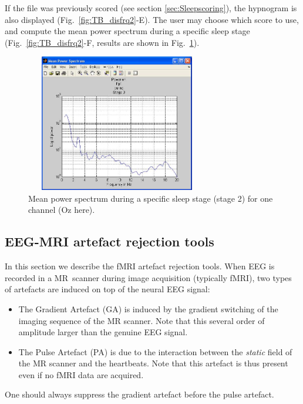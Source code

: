 \documentclass[a4paper,titlepage]{article}
\newcommand{\bi}{\begin{itemize}}
\newcommand{\ei}{\end{itemize}}
\begin{document}
If the file was previously scored (see section \ref{sec:Sleepscoring}), the hypnogram is also displayed (Fig.~\ref{fig:TB_disfrq2}-E). The user may choose which score to use, and compute the mean power spectrum during a specific sleep stage (Fig.~\ref{fig:TB_disfrq2}-F, results are shown in Fig.~\ref{fig:TB_disfrq3}).
\begin{figure}[ht]
	\centering
		\includegraphics[width=8cm,height=6cm]{images/FIG9_disfreq_pwrstage.jpg}
	\caption{Mean power spectrum during a specific sleep stage (stage 2) for one channel (Oz here).
	\label{fig:TB_disfrq3}}
\end{figure}


\subsection{EEG-MRI artefact rejection tools}
\label{sec:eeg_fmri}
In this section we describe the fMRI artefact rejection tools. When EEG is recorded in a MR~scanner during image acquisition (typically fMRI), two types of artefacts are induced on top of the neural EEG signal:
\bi
\item The Gradient Artefact (GA) is induced by the gradient switching of the imaging sequence of the MR scanner\cite{Allen2000}. Note that this several order of amplitude larger than the genuine EEG signal.
\item The Pulse Artefact (PA) is due to the interaction between the {\it static} field of the MR scanner and the heartbeats\cite{Debener2008}. Note that this artefact is thus present even if no fMRI data are acquired.
\ei
One should always suppress the gradient artefact before the pulse artefact.
\end{document}
